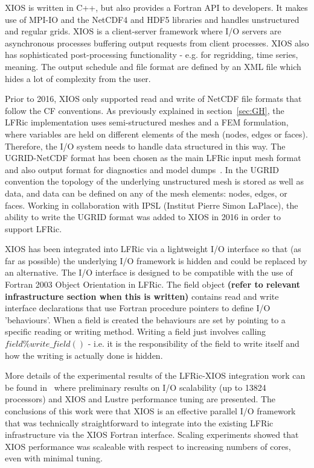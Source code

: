 \documentclass[times]{elsarticle}
\begin{document}
XIOS is written in C++, but also provides a Fortran API to developers. It makes use of
MPI-IO and the NetCDF4 and HDF5 libraries and handles unstructured and regular grids.
XIOS is a client-server framework where I/O servers are asynchronous processes buffering
output requests from client processes. XIOS also has sophisticated post-processing
functionality - e.g. for regridding, time series, meaning. The output schedule and
file format are defined by an XML file which hides a lot of complexity from the user.

Prior to 2016, XIOS only supported read and write of NetCDF file formats that follow the CF
conventions.  As previously explained in section~\ref{sec:GH}, the LFRic implementation uses
semi-structured meshes and a FEM formulation, where variables are held on
different elements of the mesh (nodes, edges or faces). Therefore, the I/O system needs to
handle data structured in this way. The UGRID-NetCDF format has been chosen as the main
LFRic input mesh format and also output format for diagnostics and model dumps~\cite{UgridSpec}.
In the UGRID convention the topology of the underlying unstructured mesh is stored as well as
data, and data can be defined on any of the mesh elements: nodes, edges, or faces.
Working in collaboration with IPSL (Institut Pierre Simon LaPlace), the ability to write the
UGRID format was added to XIOS in 2016 in order to support LFRic. 

XIOS has been integrated into LFRic via a lightweight I/O interface so that (as far as
possible) the underlying I/O framework is hidden and could be replaced by an alternative.
The I/O interface is designed to be compatible with the use of Fortran 2003 Object
Orientation in LFRic. The field object \textbf{(refer to relevant infrastructure section when 
this is written)} contains read and write interface declarations that use Fortran 
procedure pointers to define I/O 'behaviours'. When a field is created the behaviours
are set by pointing to a specific reading or writing method. Writing a field just involves
calling $field\%write\_field()$ - i.e. it is the responsibility of the field to write
itself and how the writing is actually done is hidden.  

More details of the experimental results of the LFRic-XIOS integration work can be
found in~\cite{Adams2018} where preliminary results on I/O scalability (up to 13824 
processors) and XIOS and Lustre performance tuning are presented. The conclusions of
this work were that XIOS is an effective parallel I/O framework that was technically
straightforward to integrate into the existing LFRic infrastructure via the XIOS
Fortran interface. Scaling experiments showed that XIOS performance was scaleable with
respect to increasing numbers of cores, even with minimal tuning.
\end{document}
